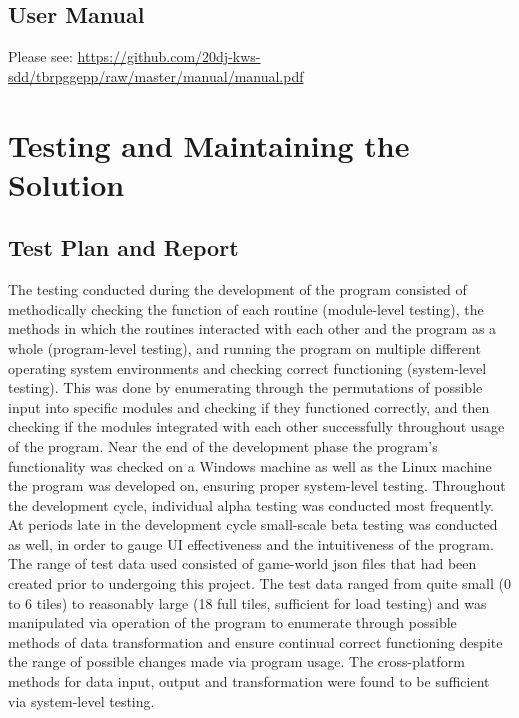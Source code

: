 \documentclass{article} \usepackage[margin=1in,headheight=57pt,headsep=0.1in]{geometry}
\begin{document}
\subsection{User Manual}
Please see: \url{https://github.com/20dj-kws-sdd/tbrpggepp/raw/master/manual/manual.pdf}
\newpage
\section{Testing and Maintaining the Solution}
\subsection{Test Plan and Report}
The testing conducted during the development of the program consisted of methodically checking the function of each routine (module-level testing), the methods in which the routines interacted with each other and the program as a whole (program-level testing), and running the program on multiple different operating system environments and checking correct functioning (system-level testing). This was done by enumerating through the permutations of possible input into specific modules and checking if they functioned correctly, and then checking if the modules integrated with each other successfully throughout usage of the program. Near the end of the development phase the program's functionality was checked on a Windows machine as well as the Linux machine the program was developed on, ensuring proper system-level testing. Throughout the development cycle, individual alpha testing was conducted most frequently. At periods late in the development cycle small-scale beta testing was conducted as well, in order to gauge UI effectiveness and the intuitiveness of the program.\\

The range of test data used consisted of game-world json files that had been created prior to undergoing this project. The test data ranged from quite small (0 to 6 tiles) to reasonably large (18 full tiles, sufficient for load testing) and was manipulated via operation of the program to enumerate through possible methods of data transformation and ensure continual correct functioning despite the range of possible changes made via program usage. The cross-platform methods for data input, output and transformation were found to be sufficient via system-level testing. \\
\end{document}
